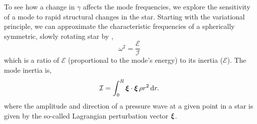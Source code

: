 To see how a change in \(\gamma\) affects the mode frequencies, we explore the sensitivity of a mode to rapid structural changes in the star. Starting with the variational principle, we can approximate the characteristic frequencies of a spherically symmetric, slowly rotating star by \citep{Chandrasekhar1964},
%
\begin{equation}
    \omega^2 = \frac{\mathcal{E}}{\mathcal{I}}\label{eq:var-prin}
\end{equation}
%
which is a ratio of \(\mathcal{E}\) (proportional to the mode's energy)
%
%
to its inertia (\(\mathcal{E}\)). The mode inertia is,
%
\begin{equation}
    \mathcal{I} = \int_0^R \bm{\xi} \cdot \bm{\xi} \, \rho r^2 \, \mathrm{d} r.
\end{equation}
%
where the amplitude and direction of a pressure wave at a given point in a star is given by the so-called Lagrangian perturbation vector \(\bm{\xi}\). 

